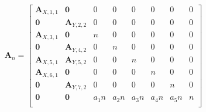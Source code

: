 \documentclass[]{article}
\begin{document}
\[
\pmb{A}_n = \begin{bmatrix}
    \pmb{A}_{X,1,1}   &    \pmb{0}     &    0     &     0 & 0 & 0 & 0 & 0\\
            \pmb{0}   &     \pmb{A}_{Y,2,2}     &    0     &     0 & 0 & 0 & 0 & 0\\
          \pmb{A}_{X, 3,1}   &     \pmb{0}     &    n     &     0 & 0 & 0 & 0 & 0\\
            \pmb{0}   & \pmb{A}_{Y, 4,2} &    0     &     n & 0 & 0 & 0 & 0\\
            \pmb{A}_{X,5,1}   &     \pmb{A}_{Y,5,2}     & 0 &    0 & n & 0 & 0 & 0\\
          \pmb{A}_{X, 6,1}   &     \pmb{0}     &    0     &     0 & 0 & n & 0 & 0\\
            \pmb{0}   & \pmb{A}_{Y, 7,2} &    0     &     0 & 0 & 0 & n & 0\\
            \pmb{0}   & \pmb{0} &    a_1n & a_2n &  a_3n & a_4n & a_5n & n\\
\end{bmatrix}
\]
\end{document}
